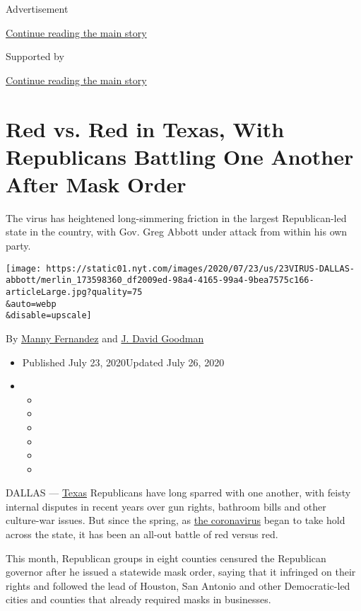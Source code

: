 Advertisement

\protect\hyperlink{after-top}{Continue reading the main story}

Supported by

\protect\hyperlink{after-sponsor}{Continue reading the main story}

\hypertarget{red-vs-red-in-texas-with-republicans-battling-one-another-after-mask-order}{%
\section{Red vs. Red in Texas, With Republicans Battling One Another
After Mask
Order}\label{red-vs-red-in-texas-with-republicans-battling-one-another-after-mask-order}}

The virus has heightened long-simmering friction in the largest
Republican-led state in the country, with Gov. Greg Abbott under attack
from within his own party.

\texttt{[image: https://static01.nyt.com/images/2020/07/23/us/23VIRUS-DALLAS-abbott/merlin\_173598360\_df2009ed-98a4-4165-99a4-9bea7575c166-articleLarge.jpg?quality=75\\\&auto=webp\\\&disable=upscale]}

By \href{https://www.nytimes.com/by/manny-fernandez}{Manny Fernandez}
and \href{https://www.nytimes.com/by/j-david-goodman}{J. David Goodman}

\begin{itemize}
\item
  Published July 23, 2020Updated July 26, 2020
\item
  \begin{itemize}
  \item
  \item
  \item
  \item
  \item
  \item
  \end{itemize}
\end{itemize}

DALLAS ---
\href{https://www.nytimes.com/2020/07/26/us/coronavirus-family-houston-masks.html}{Texas}
Republicans have long sparred with one another, with feisty internal
disputes in recent years over gun rights, bathroom bills and other
culture-war issues. But since the spring, as
\href{https://www.nytimes.com/news-event/coronavirus}{the coronavirus}
began to take hold across the state, it has been an all-out battle of
red versus red.

This month, Republican groups in eight counties censured the Republican
governor after he issued a statewide mask order, saying that it
infringed on their rights and followed the lead of Houston, San Antonio
and other Democratic-led cities and counties that already required masks
in businesses.

